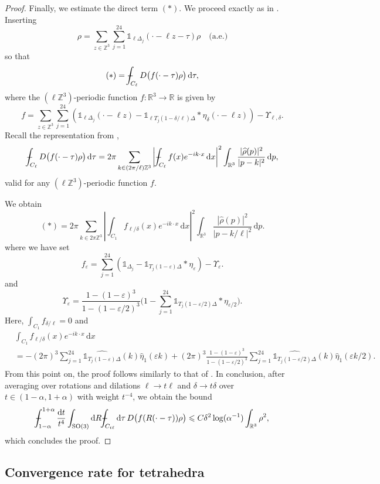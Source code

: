 \documentclass[final,onefignum,onetabnum,reqno]{amsart}
\theoremstyle{remark}
\renewcommand{\le}{\leqslant}
\renewcommand{\epsilon}{\varepsilon}
\newcommand{\wh}[1]{\widehat{#1}}
\newcommand{\RR}{\mathbb{R}}
\newcommand{\ZZ}{\mathbb{Z}}
\newcommand{\SO}{\mathrm{SO}}
\newcommand{\iden}{\mathbb{1}} %
\newcommand{\tetra}{\mathbb{\Delta}} %
\newcommand{\dd}{\mathrm{d}} %
\def\Xint#1{\mathchoice
{\XXint\displaystyle\textstyle{#1}}%
{\XXint\textstyle\scriptstyle{#1}}%
{\XXint\scriptstyle\scriptscriptstyle{#1}}%
{\XXint\scriptscriptstyle\scriptscriptstyle{#1}}%
\!\int}
\def\XXint#1#2#3{{\setbox0=\hbox{$#1{#2#3}{\int}$ }
\vcenter{\hbox{$#2#3$ }}\kern-.6\wd0}}
\def\dashint{\Xint-}
\begin{document}
\begin{proof}
Finally, we estimate the direct term $(*)$. We proceed exactly as in \cite{lewin2020local}. Inserting
$$
\rho=\sum_{z\in\ZZ^3} \sum_{j=1}^{24} \iden_{\ell\tetra_j}(\cdot - \ell z - \tau)\rho \quad \text{(a.e.)}
$$
so that
$$
(*)=\dashint_{C_\ell} D\bigl( f(\cdot-\tau)\rho\bigr)\,\dd\tau,
$$
where the $(\ell\ZZ^3)$-periodic function $f:\RR^3\to\RR$ is given by
$$
f= \sum_{z\in\ZZ^3} \sum_{j=1}^{24} \left(\iden_{\ell\tetra_j}(\cdot - \ell z)- \iden_{\ell T_j(1-\delta/\ell)\tetra} * \eta_\delta(\cdot - \ell z)\right) - \Upsilon_{\ell,\delta}.
$$
Recall the representation from \cite{lewin2020local},
$$
\dashint_{C_\ell} D\bigl( f(\cdot-\tau)\rho\bigr)\,\dd\tau=2\pi \sum_{k\in (2\pi/\ell)\ZZ^3} \left|\dashint_{C_\ell} f(x)e^{-ik\cdot x}\,\dd x\right|^2 \int_{\RR^3} \frac{|\wh{\rho}(p)|^2}{|p-k|^2}\,\dd p,
$$
valid for any $(\ell\ZZ^3)$-periodic function $f$.

We obtain
$$
(*)=2\pi \sum_{k\in 2\pi\ZZ^3} \left|\int_{C_1} f_{\ell/\delta}(x)e^{-ik\cdot x}\,\dd x\right|^2 \int_{\RR^3} \frac{|\wh{\rho}(p)|^2}{|p-k/\ell|^2}\,\dd p.
$$
where we have set
$$
f_\epsilon=\sum_{j=1}^{24}\left(\iden_{\tetra_j}- \iden_{T_j(1-\epsilon)\tetra} * \eta_{\epsilon}\right) - \Upsilon_{\epsilon}.
$$
and
$$
\Upsilon_{\epsilon}=\frac{1-(1-\epsilon)^3}{1-(1-\epsilon/2)^3}\Bigg(1-\sum_{j=1}^{24} \iden_{T_j(1-\epsilon/2)\tetra} * \eta_{\epsilon/2}\Bigg).
$$
Here, $\int_{C_1} f_{\delta/\ell}=0$ and 
\begin{align*}
&\int_{C_1} f_{\ell/\delta}(x)e^{-ik\cdot x}\,\dd x\\
&= -(2\pi)^3\sum_{j=1}^{24} \wh{\iden_{T_j(1-\epsilon)\tetra}}(k) \wh{\eta}_1(\epsilon k) 
+ (2\pi)^3\frac{1-(1-\epsilon)^3}{1-(1-\epsilon/2)^3}\sum_{j=1}^{24} \wh{\iden_{T_j(1-\epsilon/2)\tetra}}(k)\wh{\eta}_1(\epsilon k/2).
\end{align*}
From this point on, the proof follows similarly to that of \cite[Proposition 1]{lewin2020local}. In conclusion, after
averaging over rotations and dilations $\ell\to t\ell$ and $\delta\to t\delta$ over $t\in(1-\alpha,1+\alpha)$ with weight $t^{-4}$, we obtain the bound
$$
\dashint_{1-\alpha}^{1+\alpha}\frac{\dd t}{t^4} \int_{\SO(3)}\dd R \dashint_{C_{t\ell}}\dd\tau\, D\bigl( f(R(\cdot-\tau))\rho\bigr)\le C\delta^2\log(\alpha^{-1}) \int_{\RR^3} \rho^2,
$$
which concludes the proof.
\end{proof}

\subsection{Convergence rate for tetrahedra}
\end{document}
